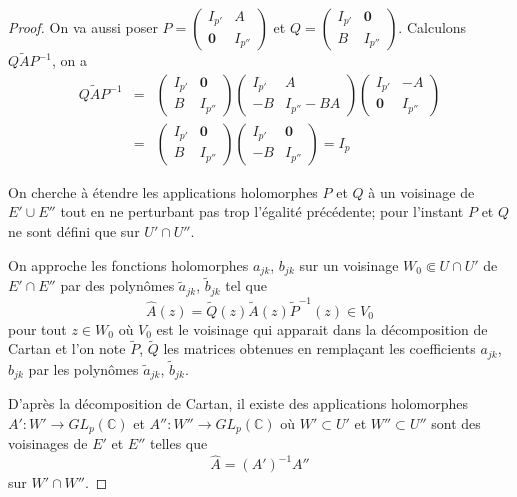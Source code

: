 \documentclass{article}
\theoremstyle{definition}
\theoremstyle{remarque}
\begin{document}
\begin{proof}
On va aussi poser $P = \begin{pmatrix}
   I_{p'} & A \\
   \mathbf{0} & I_{p''} 
\end{pmatrix}$
et $Q = \begin{pmatrix}
   I_{p'} & \mathbf{0} \\
   B & I_{p''} 
\end{pmatrix}$. Calculons $Q\tilde{A}P^{-1}$, on a
\begin{eqnarray}
\nonumber Q\tilde{A}P^{-1} &=& \begin{pmatrix}
   I_{p'} & \mathbf{0} \\
   B & I_{p''} 
\end{pmatrix}
\begin{pmatrix}
   I_{p'} & A \\
   -B & I_{p''} - BA 
\end{pmatrix}
\begin{pmatrix}
   I_{p'} & -A \\
   \mathbf{0} & I_{p''} 
\end{pmatrix} \\
\nonumber &=& \begin{pmatrix}
   I_{p'} & \mathbf{0} \\
   B & I_{p''} 
\end{pmatrix}\begin{pmatrix}
   I_{p'} & \mathbf{0} \\
   -B & I_{p''} 
\end{pmatrix} = I_p
\end{eqnarray}

On cherche à étendre les applications holomorphes $P$ et $Q$ à un voisinage de $E' \cup E''$ tout en ne perturbant pas trop l'égalité précédente; pour l'instant $P$ et $Q$ ne sont défini que sur $U' \cap U''$.

On approche les fonctions holomorphes $a_{jk}$, $b_{jk}$ sur un voisinage $W_0 \Subset U \cap U'$ de $E'\cap E''$ par des polynômes $\tilde{a}_{jk}$, $\tilde{b}_{jk}$ tel que $$\hat{A}(z) = \tilde{Q}(z)\tilde{A}(z)\tilde{P}^{-1}(z) \in V_0$$ pour tout $z \in W_0$ où $V_0$ est le voisinage qui apparait dans la décomposition de Cartan et l'on note $\tilde{P}$, $\tilde{Q}$ les matrices obtenues en remplaçant les coefficients $a_{jk}$, $b_{jk}$ par les polynômes $\tilde{a}_{jk}$, $\tilde{b}_{jk}$.

D'après la décomposition de Cartan, il existe des applications holomorphes $A' : W' \to GL_p(\mathbb{C})$ et $A'' : W'' \to GL_p(\mathbb{C})$ où $W' \subset U'$ et $W'' \subset U''$ sont des voisinages de $E'$ et $E''$ telles que $$\hat{A} = (A')^{-1}A''$$ sur $W' \cap W''$.


\end{proof}
\end{document}
